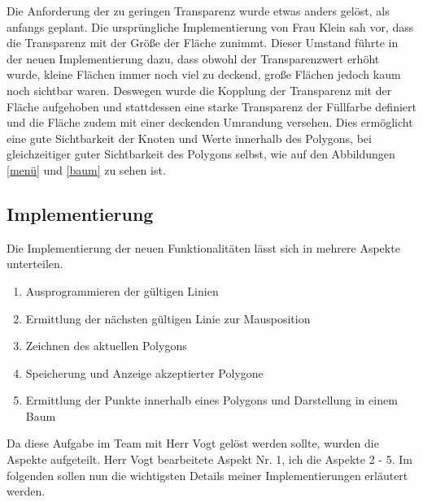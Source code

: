 Die Anforderung der zu geringen Transparenz wurde etwas anders gelöst, als anfangs geplant. Die ursprüngliche Implementierung von Frau Klein sah vor, dass die Transparenz mit der Größe der Fläche zunimmt. Dieser Umstand führte in der neuen Implementierung dazu, dass obwohl der Transparenzwert erhöht wurde, kleine Flächen immer noch viel zu deckend, große Flächen jedoch kaum noch sichtbar waren. Deswegen wurde die Kopplung der Transparenz mit der Fläche aufgehoben und stattdessen eine starke Transparenz der Füllfarbe definiert und die Fläche zudem mit einer deckenden Umrandung versehen. Dies ermöglicht eine gute Sichtbarkeit der Knoten und Werte innerhalb des Polygons, bei gleichzeitiger guter Sichtbarkeit des Polygons selbst, wie auf den Abbildungen \ref{menü} und \ref{baum} zu sehen ist.



\subsection{Implementierung}

Die Implementierung der neuen Funktionalitäten lässt sich in mehrere Aspekte unterteilen.
\begin{enumerate}
\item Ausprogrammieren der gültigen Linien
\item Ermittlung der nächsten gültigen Linie zur Mausposition
\item Zeichnen des aktuellen Polygons
\item Speicherung und Anzeige akzeptierter Polygone
\item Ermittlung der Punkte innerhalb eines Polygons und Darstellung in einem Baum
\end{enumerate}

Da diese Aufgabe im Team mit Herr Vogt gelöst werden sollte, wurden die Aspekte aufgeteilt. Herr Vogt bearbeitete Aspekt Nr. 1, ich die Aspekte 2 - 5. Im folgenden sollen nun die wichtigsten Details meiner Implementierungen erläutert werden.

